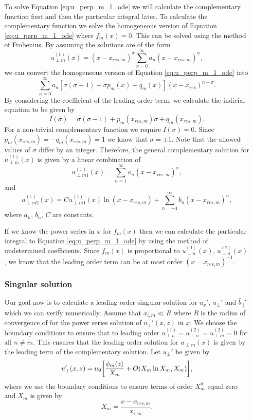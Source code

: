 \documentclass[linenumbers]{aastex63}
\begin{document}
To solve Equation \eqref{eq:u_perp_m_1_ode} we will calculate the complementary function first and then the particular integral later. To calculate the complementary function we solve the homogeneous version of Equation \eqref{eq:u_perp_m_1_ode} where $f_m(x)=0$. This can be solved using the method of Frobenius. By assuming the solutions are of the form
\[u_{\perp m}^{(1)}(x) = (x-x_{res,m})^\sigma\sum_{n=0}^\infty a_n(x-x_{res,m})^n,\]
we can convert the homogeneous version of Equation \eqref{eq:u_perp_m_1_ode} into
\[\sum_{n=0}^\infty a_n[\sigma(\sigma-1)+\sigma p_m(x) + q_m(x)](x-x_{res})^{n+\sigma}.\]
By considering the coefficient of the leading order term, we calculate the indicial equation to be given by
\[I(\sigma)=\sigma(\sigma-1)+p_m(x_{res,m})\sigma + q_m(x_{res,m}).\]
For a non-trivial complementary function we require $I(\sigma)=0$. Since $p_m(x_{res,m})=-q_m(x_{res,m})=1$ we know that $\sigma =\pm1$. Note that the allowed values of $\sigma$ differ by an integer. Therefore, the general complementary solution for $u_{\perp m}^{(1)}(x)$ is given by a linear combination of
\begin{equation}
    u_{\perp m 1}^{(1)}(x) = \sum_{n=1}^\infty a_n (x-x_{res,m})^n,
\end{equation}
and
\begin{equation}
    u_{\perp m 2}^{(1)}(x) = Cu_{\perp m 1}^{(1)}(x) \ln(x-x_{res,m}) + \sum_{n=-1}^\infty b_n(x-x_{res,m})^n,
\end{equation}
where $a_n$, $b_n$, $C$ are constants.

If we know the power series in $x$ for $f_m(x)$ then we can calculate the particular integral to Equation \eqref{eq:u_perp_m_1_ode} by using the method of undetermined coefficients. Since $f_m(x)$ is proportional to $u_{\perp n}^{(1)}(x)$, $u_{\perp n}^{(2)}(x)$, we know that the leading order term can be at most order $(x-x_{res,m})^{-1}$.

\subsubsection{Singular solution}

Our goal  now is to calculate a leading order singular solution for $u_x'$, $u_\perp'$ and $\hat{b}_{||}'$ which we can verify numerically.
Assume that $x_{i,m}\ll R$ where $R$ is the radius of convergence of for the power series solution of $u_\perp'(x,z)$ in $x$. We choose the boundary conditions to ensure that to leading order $u_{\perp n}^{(1)}=u_{\perp n}^{(2)}=u_{\perp m}^{(2)}=0$ for all $n\ne m$. This ensures that the leading order solution for $u_{\perp m}(x)$ is given by the leading term of the complementary solution. Let $u_\perp'$ be given by
\begin{equation}
    \label{eq:u_perp_singular_soln}
    u_\perp'(x,z) = u_0\qty[\frac{\phi_m(z)}{X_{m}} + O(X_m\ln X_m,X_m)],
\end{equation}
where we use the boundary conditions to ensure terms of order $X_m^0$ equal zero and $X_m$ is given by
\begin{equation}
    X_m=\frac{x - x_{res,m}}{x_{i,m}}.
\end{equation}
\end{document}

